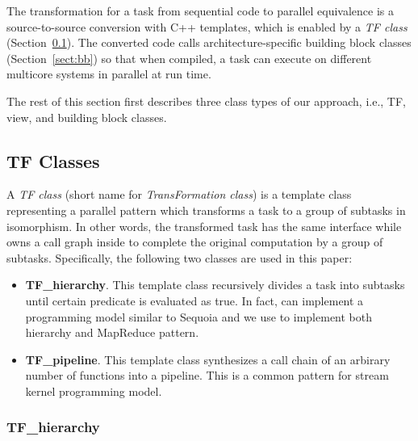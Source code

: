 The transformation for a task from sequential code to parallel equivalence is a
source-to-source conversion with C++ templates, which is enabled by a \emph{TF
class} (Section~\ref{sect:tf}).  The converted code calls
architecture-specific building block classes (Section~\ref{sect:bb}) so that
when compiled, a task can execute on
different multicore systems in parallel at run time. 

The rest of this section first describes three class types of our approach, i.e.,
TF, view, and building block classes. 

\subsection{TF Classes}
\label{sect:tf}

A \textit{TF class} (short name for \textit{TransFormation class}) is a template
class representing a parallel pattern which transforms a task to a group of
subtasks in isomorphism. In other words, the transformed task has the same interface
while owns a call graph inside to complete the original computation by a
group of subtasks. Specifically, the following two classes are used in this paper: 

\begin{itemize} 
\item \textbf{TF\_hierarchy}. This template class recursively divides a task into subtasks
until certain predicate is evaluated as true. %
In fact,  can implement a programming model similar to Sequoia and
we use  to implement both hierarchy and MapReduce pattern.

\item \textbf{TF\_pipeline}. This template class synthesizes a call chain of an
arbirary number of functions into a pipeline. This is a common pattern for
stream kernel programming model.
\end{itemize} 

\subsubsection{TF\_hierarchy}

